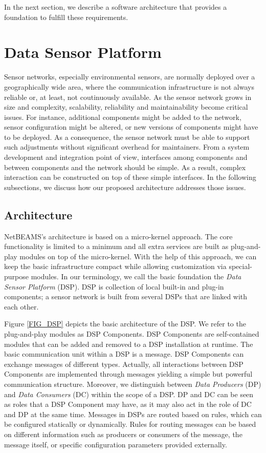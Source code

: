\documentclass[conference]{IEEEtran}
\begin{document}
In the next section, we describe a software architecture that provides
a foundation to fulfill these requirements.


\section{Data Sensor Platform}
\label{SEC_DSP}

Sensor networks, especially environmental sensors, are normally
deployed over a geographically wide area, where the communication
infrastructure is not always reliable or, at least, not coutinuously
available. As the sensor network grows in size and complexity, 
scalability, reliability and maintainability become critical issues.
For instance, additional components might be added to the network, sensor
configuration might be altered, or new versions of components might have to be
deployed. As a consequence, the sensor network must be able to support such
adjustments without significant overhead for maintainers.  From a system
development and integration point of view, interfaces among components
and between components and the network should be simple. As a result, complex
interaction can be constructed on top of these simple interfaces. In
the following subsections, we discuss how our proposed architecture addresses
those issues.

\subsection{Architecture}

NetBEAMS's architecture is based on a micro-kernel approach. The core
functionality is limited to a minimum and all extra services are built
as plug-and-play modules on top of the micro-kernel. With the help of
this approach, we can keep the basic infrastructure compact while
allowing customization via special-purpose modules. In our terminology,
we call the basic foundation the \emph{Data Sensor Platform}
(DSP). DSP is collection of local built-in and plug-in components; 
a sensor network is built from several DSPs that are linked
with each other.

Figure \ref{FIG_DSP} depicts the basic architecture of the DSP. We
refer to the plug-and-play modules as DSP Components. DSP Components
are self-contained modules that can be added and removed to a DSP
installation at runtime. The basic communication unit within a DSP
is a message. DSP Components can exchange messages of different types.
Actually, all interactions between DSP Components are implemented
through messages yielding a simple but powerful communication
structure. Moreover, we distinguish between \emph{Data Producers} (DP) and
\emph{Data Consumers} (DC) within the scope of a DSP. DP and DC can be
seen as roles that a DSP Component may have, as it may also 
act in the role of DC and DP at the same time. Messages
in DSPs are routed based on rules, which can be configured statically
or dynamically. Rules for routing messages can be based on different
information such as producers or consumers of the message, the message
itself, or specific configuration parameters provided externally.
\end{document}

